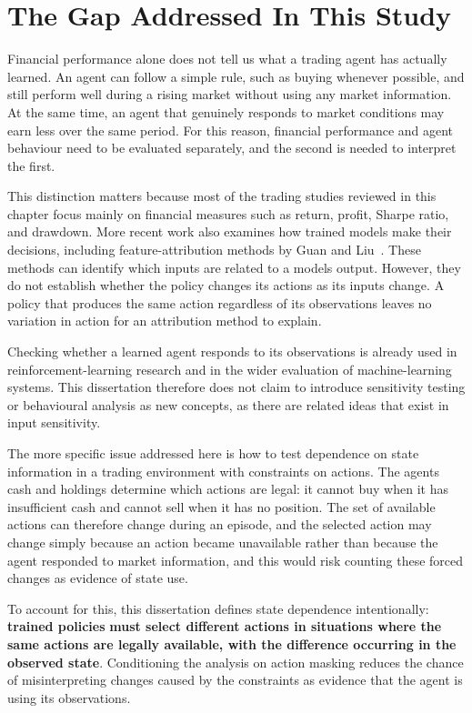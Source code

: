 \section{The Gap Addressed In This Study}
Financial performance alone does not tell us what a trading agent has
actually learned. An agent can follow a simple rule, such as buying
whenever possible, and still perform well during a rising market without
using any market information. At the same time, an agent that genuinely
responds to market conditions may earn less over the same period. For
this reason, financial performance and agent behaviour need to
be evaluated separately, and the second is needed to interpret the
first.

This distinction matters because most of the trading studies reviewed in
this chapter focus mainly on financial measures such as return, profit,
Sharpe ratio, and drawdown. More recent work also examines how trained
models make their decisions, including feature-attribution methods by
Guan and Liu~\cite{guan2021xrl}. These methods can identify which inputs are
related to a model\textquotesingle s output. However, they do not
establish whether the policy changes its actions as its inputs change. A
policy that produces the same action regardless of its observations
leaves no variation in action for an attribution method to explain.

Checking whether a learned agent responds to its observations is already
used in reinforcement-learning research and in the wider evaluation of
machine-learning systems. This dissertation therefore does not claim to
introduce sensitivity testing or behavioural analysis as new concepts,
as there are related ideas that exist in input sensitivity.

The more specific issue addressed here is how to test dependence on
state information in a trading environment with constraints on actions.
The agent\textquotesingle s cash and holdings determine which actions
are legal: it cannot buy when it has insufficient cash and cannot sell
when it has no position. The set of available actions can therefore
change during an episode, and the selected action may change simply
because an action became unavailable rather than because the agent
responded to market information, and this would risk counting these
forced changes as evidence of state use.

To account for this, this dissertation defines state dependence
intentionally: \textbf{trained policies} \textbf{must select different
actions in situations where the same actions are legally available, with
the difference occurring in the observed state}. Conditioning the
analysis on action masking reduces the chance of misinterpreting changes
caused by the constraints as evidence that the agent is using its
observations.

